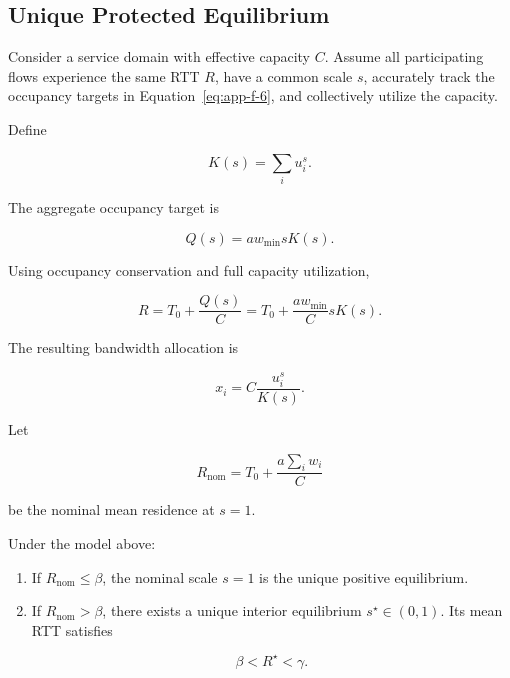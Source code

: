 \subsection{Unique Protected Equilibrium}
\label{app:f-3}

Consider a service domain with effective capacity \(C\). Assume all participating flows experience the same RTT \(R\), have a common scale \(s\), accurately track the occupancy targets in Equation~\eqref{eq:app-f-6}, and collectively utilize the capacity.

Define

\begin{equation}
\label{eq:app-f-18}
K(s)=\sum_i u_i^s.
\end{equation}

The aggregate occupancy target is

\begin{equation}
\label{eq:app-f-19}
Q(s)=aw_{\min}sK(s).
\end{equation}

Using occupancy conservation and full capacity utilization,

\begin{equation}
\label{eq:app-f-20}
R=T_0+\frac{Q(s)}{C}
=T_0+\frac{aw_{\min}}{C}sK(s).
\end{equation}

The resulting bandwidth allocation is

\begin{equation}
\label{eq:app-f-21}
x_i=C\frac{u_i^s}{K(s)}.
\end{equation}

Let

\begin{equation}
\label{eq:app-f-22}
R_{\mathrm{nom}}
=
T_0+\frac{a\sum_iw_i}{C}
\end{equation}

be the nominal mean residence at \(s=1\).

\begin{theorem}
\label{thm:f-1}
Under the model above:

\begin{enumerate}
\item If \(R_{\mathrm{nom}}\le\beta\), the nominal scale \(s=1\) is the unique positive equilibrium.
\item If \(R_{\mathrm{nom}}>\beta\), there exists a unique interior equilibrium \(s^\star\in(0,1)\). Its mean RTT satisfies

\begin{equation}
\label{eq:app-f-23}
\boxed{
\beta<R^\star<\gamma.
}
\end{equation}
\end{enumerate}
\end{theorem}


